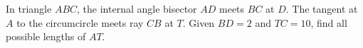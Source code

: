 In triangle $ABC$, the internal angle bisector $AD$ meets $BC$ at $D$. The tangent at $A$ to the circumcircle meets ray $CB$ at $T$. Given $BD=2$ and $TC=10$, find all possible lengths of $AT$.
